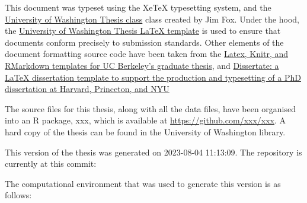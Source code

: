 \documentclass[print]{nuthesis}
\begin{document}
This document was typeset using the XeTeX typesetting system, and the \href{http://staff.washington.edu/fox/tex/}{University of Washington Thesis class} class created by Jim Fox. Under the hood, the \href{https://github.com/UWIT-IAM/UWThesis}{University of Washington Thesis LaTeX template} is used to ensure that documents conform precisely to submission standards. Other elements of the document formatting source code have been taken from the \href{https://github.com/stevenpollack/ucbthesis}{Latex, Knitr, and RMarkdown templates for UC Berkeley's graduate thesis}, and \href{https://github.com/suchow/Dissertate}{Dissertate: a LaTeX dissertation template to support the production and typesetting of a PhD dissertation at Harvard, Princeton, and NYU}

The source files for this thesis, along with all the data files, have been organised into an R package, xxx, which is available at \url{https://github.com/xxx/xxx}. A hard copy of the thesis can be found in the University of Washington library.

This version of the thesis was generated on 2023-08-04 11:13:09. The repository is currently at this commit:

The computational environment that was used to generate this version is as follows:
\end{document}
